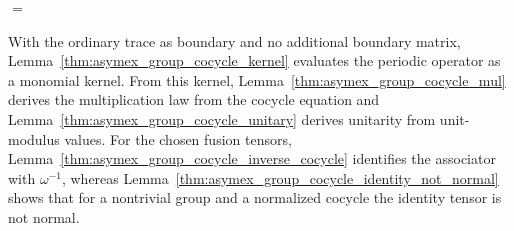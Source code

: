 \begin{center}
    \tenkzkernel
    \begin{tenkz}[cols=1, bonds=none]
    \end{tenkz}
    \quad $=$ \quad
    \begin{tenkz}[rows={wire,wire,wire}, cols=2, bonds=none]
        \tn[at=(2,2), name=c, skin=dot, ports={90:physical, 270:physical, 180:physical}]{}
        \tn[at=(3,2), name=d, skin=dot, ports={90:physical, 270:physical:$b$, 0:virtual:$r$}]{}
    \end{tenkz}
\end{center}

With the ordinary trace as boundary and no additional boundary matrix,
Lemma~\ref{thm:asymex_group_cocycle_kernel} evaluates the periodic operator
as a monomial kernel. From this kernel,
Lemma~\ref{thm:asymex_group_cocycle_mul} derives the multiplication law from
the cocycle equation and Lemma~\ref{thm:asymex_group_cocycle_unitary} derives
unitarity from unit-modulus values. For the chosen fusion tensors,
Lemma~\ref{thm:asymex_group_cocycle_inverse_cocycle} identifies the
associator with $\omega^{-1}$, whereas
Lemma~\ref{thm:asymex_group_cocycle_identity_not_normal} shows that for a
nontrivial group and a normalized cocycle the identity tensor is not normal.


